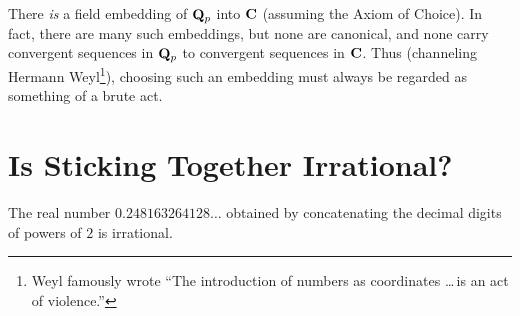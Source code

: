 {\scriptsize There \emph{is} a field embedding of $\mathbf{Q}_p$ into $\mathbf{C}$ (assuming the Axiom of Choice). In fact, there are many such embeddings, but none are canonical, and none carry convergent sequences in $\mathbf{Q}_p$ to convergent sequences in $\mathbf{C}$. Thus (channeling Hermann Weyl\footnote{Weyl famously wrote ``The introduction of numbers as coordinates \dots\,is an act of violence.''}), choosing such an embedding must always be regarded as something of a brute act.}

\section*{Is Sticking Together Irrational?}
\begin{prob}[Mahler]\label{prob:mahlerirrational} The real number $0.248163264128\dots$ obtained by concatenating the decimal digits of powers of $2$ is irrational.
\end{prob}

